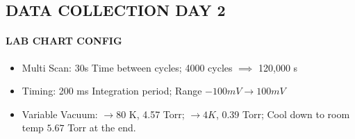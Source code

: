 \documentclass{article}
\begin{document}
\newpage
{}
\subsection{DATA COLLECTION DAY 2}
\paragraph{LAB CHART CONFIG}
\begin{itemize}
    \item Multi Scan: 30s Time between cycles; 4000 cycles $\implies$ 120,000 s
    \item Timing: 200 ms Integration period; Range $-100mV \to 100mV$ 
    \item Variable Vacuum: $\to 80$ K, 4.57 Torr; $\to 4K$, 0.39 Torr; Cool down to room temp $5.67$ Torr at the end.
\end{itemize}
\end{document}
